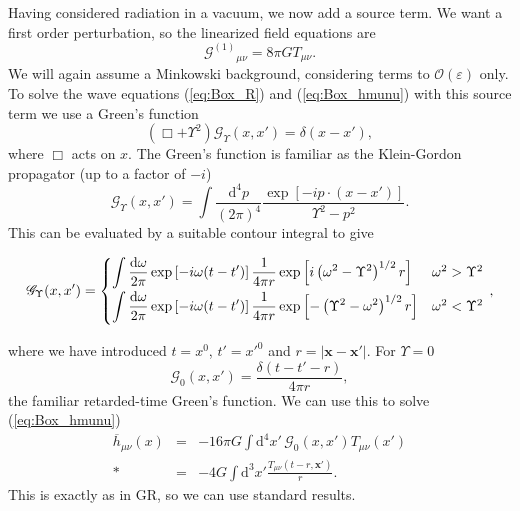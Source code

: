 \documentclass[aps,prd,amsfonts,amssymb,amsmath,nofootinbib,reprint,showpacs]{revtex4-1}
\newcommand{\eqnref}[1]{(\ref{eq:#1})}
\newcommand{\dd}{\ensuremath{\text{d}}}
\newcommand{\recip}[1]{\ensuremath{\frac{1}{#1}}}
\newcommand{\order}[1]{\ensuremath{\mathcal{O}({#1})}}
\begin{document}
Having considered radiation in a vacuum, we now add a source term. We want a first order perturbation, so the linearized field equations are
\begin{equation}
{\mathcal{G}^{(1)}}_{\mu\nu} = 8\pi G T_{\mu\nu}.
\end{equation}
We will again assume a Minkowski background, considering terms to $\order{\varepsilon}$ only. To solve the wave equations \eqnref{Box_R} and \eqnref{Box_hmunu} with this source term we use a Green's function
\begin{equation}
\left(\Box + \Upsilon^2\right)\mathscr{G}_\Upsilon(x, x') = \delta(x - x'),
\end{equation}
where $\Box$ acts on $x$. The Green's function is familiar as the Klein-Gordon propagator (up to a factor of $-i$)~\cite{Peskin1995a}
\begin{equation}
\mathscr{G}_\Upsilon(x, x') = \int \frac{\dd^4 p}{(2\pi)^4} \frac{\exp\left[-ip\cdot(x-x')\right]}{\Upsilon^2 - p^2}.
\end{equation}
This can be evaluated by a suitable contour integral to give
\begin{widetext}
\begin{equation}
\mathscr{G}_\Upsilon(x, x') =
\begin{cases}
{\displaystyle \int{\frac{\dd \omega}{2\pi} \exp\left[-i\omega(t-t')\right]\recip{4\pi r}\exp\left[i\left(\omega^2 - \Upsilon^2\right)^{1/2}r\right]}} & \omega^2 > \Upsilon^2\vspace{0.8mm}\\
{\displaystyle \int{\frac{\dd \omega}{2\pi} \exp\left[-i\omega(t-t')\right]\recip{4\pi r}\exp\left[-\left(\Upsilon^2 - \omega^2\right)^{1/2}r\right]}} & \omega^2 < \Upsilon^2\vspace{0.8mm}
\end{cases}\, ,
\label{eq:Green}
\end{equation}
\end{widetext}
where we have introduced $t = x^0$, $t' = x'^0$ and $r = |\boldsymbol{x} - \boldsymbol{x'}|$. For $\Upsilon = 0$
\begin{equation}
\mathscr{G}_0(x, x') = \frac{\delta(t - t' - r)}{4 \pi r},
\end{equation}
the familiar retarded-time Green's function. We can use this to solve \eqnref{Box_hmunu}
\begin{eqnarray}
\overline{h}_{\mu\nu}(x) & = & -16 \pi G \int \dd^4 x'\, \mathscr{G}_0(x, x') T_{\mu\nu}(x') \nonumber \\*
 & = & -4 G \int \dd^3 x' \frac{T_{\mu\nu}(t - r, \boldsymbol{x'})}{r}.
\end{eqnarray}
This is exactly as in GR, so we can use standard results.
\end{document}
